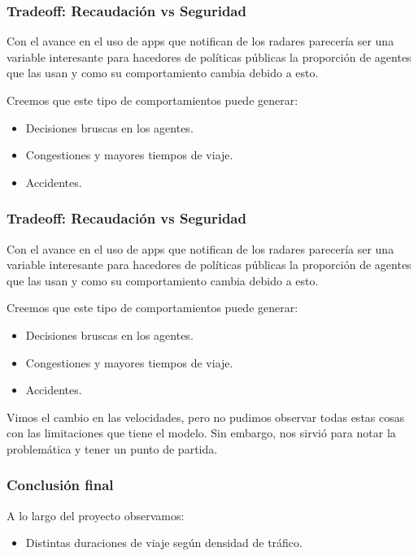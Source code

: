 \documentclass[10pt, compress]{beamer}
\begin{document}
\begin{frame}[fragile]
\frametitle{Tradeoff: Recaudaci\'on vs Seguridad}
Con el avance en el uso de apps que notifican de los radares parecer\'ia ser una variable interesante para hacedores de pol\'iticas p\'ublicas la proporci\'on de agentes que las usan y como su comportamiento cambia debido a esto.

Creemos que este tipo de comportamientos puede generar:

\begin{itemize}
\item Decisiones bruscas en los agentes.
\item Congestiones y mayores tiempos de viaje.
\item Accidentes.
\end{itemize}

\end{frame}

\begin{frame}[fragile]
\frametitle{Tradeoff: Recaudaci\'on vs Seguridad}
Con el avance en el uso de apps que notifican de los radares parecer\'ia ser una variable interesante para hacedores de pol\'iticas p\'ublicas la proporci\'on de agentes que las usan y como su comportamiento cambia debido a esto.

Creemos que este tipo de comportamientos puede generar:

\begin{itemize}
\item Decisiones bruscas en los agentes.
\item Congestiones y mayores tiempos de viaje.
\item Accidentes.
\end{itemize}

Vimos el cambio en las velocidades, pero no pudimos observar todas estas cosas con las limitaciones que tiene el modelo. Sin embargo, nos sirvi\'o para notar la problem\'atica y tener un punto de partida.

\end{frame}

\begin{frame}[fragile]
\frametitle{Conclusi\'on final}

A lo largo del proyecto observamos:
\begin{itemize}
\item Distintas duraciones de viaje seg\'un densidad de tr\'afico.
\end{itemize}
\end{frame}
\end{document}
